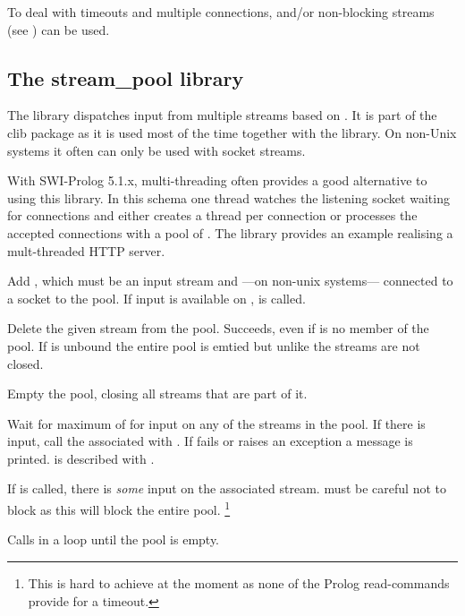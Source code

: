 \documentclass[11pt]{article}
\begin{document}
\noindent
To deal with timeouts and multiple connections,  and/or
non-blocking streams (see ) can be used.


\subsection{The stream_pool library}

The  library dispatches input from multiple streams
based on .  It is part of the clib package as it is used
most of the time together with the  library.  On non-Unix
systems it often can only be used with socket streams.

With SWI-Prolog 5.1.x, multi-threading often provides a good alternative
to using this library. In this schema one thread watches the listening
socket waiting for connections and either creates a thread per
connection or processes the accepted connections with a pool of
. The library  provides
an example realising a mult-threaded HTTP server.

\begin{description}
Add , which must be an input stream and ---on non-unix
systems--- connected to a socket to the pool.  If input is available
on ,  is called.

Delete the given stream from the pool.  Succeeds, even if 
is no member of the pool.  If  is unbound the entire pool
is emtied but unlike  the streams are not closed.

Empty the pool, closing all streams that are part of it.

Wait for maximum of  for input on any of the streams in
the pool.  If there is input, call the  associated with
.  If  fails or raises an exception a
message is printed.   is described with .

If  is called, there is \emph{some} input on the associated
stream.   must be careful not to block as this will block
the entire pool.%
    \footnote{This is hard to achieve at the moment as none of the
	      Prolog read-commands provide for a timeout.}

Calls  in a loop until the pool is empty.
\end{description}
\end{document}
